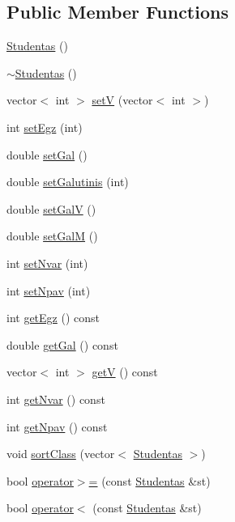\subsection*{Public Member Functions}
\begin{DoxyCompactItemize}
\item 
\mbox{\hyperlink{class_studentas_ab459e995e8c9b24cdc9aec5b09a66539}{Studentas}} ()
\item 
\mbox{\hyperlink{class_studentas_a63e449e0f51a0b14340d02ee71b4be23}{$\sim$\+Studentas}} ()
\item 
vector$<$ int $>$ \mbox{\hyperlink{class_studentas_a48db4c8859efce4505444f85c9c9b4ea}{setV}} (vector$<$ int $>$)
\item 
int \mbox{\hyperlink{class_studentas_aa6798e0694f584a82485fcb858652313}{set\+Egz}} (int)
\item 
double \mbox{\hyperlink{class_studentas_a83b07fa9066e89f424f894d351c2d1ac}{set\+Gal}} ()
\item 
double \mbox{\hyperlink{class_studentas_a6557c8934c2b2602cfd28680cd6c3702}{set\+Galutinis}} (int)
\item 
double \mbox{\hyperlink{class_studentas_adbb4c62ae2abdeafba0a08e713abd483}{set\+GalV}} ()
\item 
double \mbox{\hyperlink{class_studentas_a2f030abae9dd890d3e422030eb85b55b}{set\+GalM}} ()
\item 
int \mbox{\hyperlink{class_studentas_ac7d635d4eaf600c486b9511249106b27}{set\+Nvar}} (int)
\item 
int \mbox{\hyperlink{class_studentas_abe6369aa11c793bc46b1b2ef0067c942}{set\+Npav}} (int)
\item 
int \mbox{\hyperlink{class_studentas_a2f9dcb2fef2e6b3dbc1581779a90a68a}{get\+Egz}} () const
\item 
double \mbox{\hyperlink{class_studentas_adb71a1b0d9e2e5a79f4fb1238d56f3ce}{get\+Gal}} () const
\item 
vector$<$ int $>$ \mbox{\hyperlink{class_studentas_a118f19c598829443b72d6c58db30530a}{getV}} () const
\item 
int \mbox{\hyperlink{class_studentas_a504840a8d0aac4dd9d34c4e52c392254}{get\+Nvar}} () const
\item 
int \mbox{\hyperlink{class_studentas_a4d98916d86a6a4669463d7436ba6a01a}{get\+Npav}} () const
\item 
void \mbox{\hyperlink{class_studentas_a4ec32f3cae767ae8f71bdf5928045e94}{sort\+Class}} (vector$<$ \mbox{\hyperlink{class_studentas}{Studentas}} $>$)
\item 
bool \mbox{\hyperlink{class_studentas_a8d3e642c70dc38794fa9fc8d828892c7}{operator$>$=}} (const \mbox{\hyperlink{class_studentas}{Studentas}} \&st)
\item 
bool \mbox{\hyperlink{class_studentas_a9ad5e649c7ddb16d39024011b84f7f42}{operator$<$}} (const \mbox{\hyperlink{class_studentas}{Studentas}} \&st)
\end{DoxyCompactItemize}
